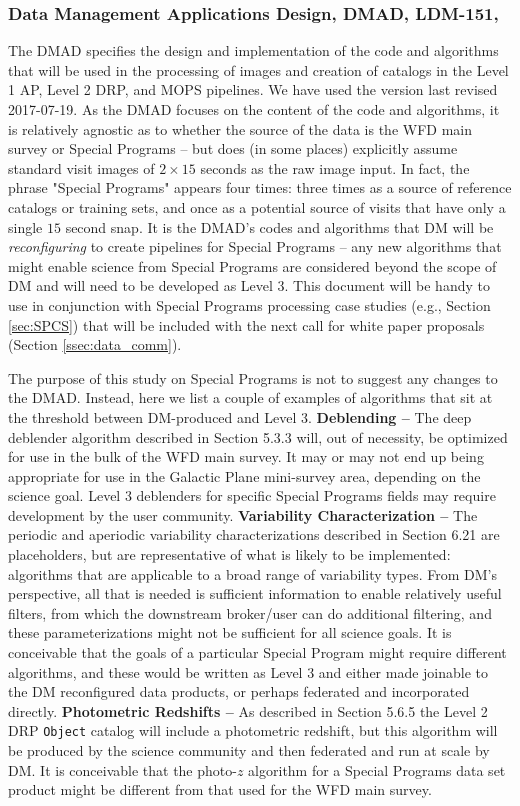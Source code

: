 \documentclass[DM,lsstdraft,toc]{lsstdoc}
\begin{document}
\subsubsection{Data Management Applications Design, DMAD, LDM-151, \cite{LDM-151}}\label{sssec:dmplans_review_dmad}

The DMAD specifies the design and implementation of the code and algorithms that will be used in the processing of images and creation of catalogs in the Level 1 AP, Level 2 DRP, and MOPS pipelines. We have used the version last revised 2017-07-19. As the DMAD focuses on the content of the code and algorithms, it is relatively agnostic as to whether the source of the data is the WFD main survey or Special Programs -- but does (in some places) explicitly assume standard visit images of $2\times15$ seconds as the raw image input. In fact, the phrase "Special Programs" appears four times: three times as a source of reference catalogs or training sets, and once as a potential source of visits that have only a single $15$ second snap. It is the DMAD's codes and algorithms that DM will be {\it reconfiguring} to create pipelines for Special Programs -- any new algorithms that might enable science from Special Programs are considered beyond the scope of DM and will need to be developed as Level 3. This document will be handy to use in conjunction with Special Programs processing case studies (e.g., Section \ref{sec:SPCS}) that will be included with the next call for white paper proposals (Section \ref{ssec:data_comm}). 

The purpose of this study on Special Programs is not to suggest any changes to the DMAD. Instead, here we list a couple of examples of algorithms that sit at the threshold between DM-produced and Level 3. {\bf Deblending --} The deep deblender algorithm described in Section 5.3.3 will, out of necessity, be optimized for use in the bulk of the WFD main survey. It may or may not end up being appropriate for use in the Galactic Plane mini-survey area, depending on the science goal. Level 3 deblenders for specific Special Programs fields may require development by the user community. {\bf Variability Characterization --} The periodic and aperiodic variability characterizations described in Section 6.21 are placeholders, but are representative of what is likely to be implemented: algorithms that are applicable to a broad range of variability types. From DM's perspective, all that is needed is sufficient information to enable relatively useful filters, from which the downstream broker/user can do additional filtering, and these parameterizations might not be sufficient for all science goals. It is conceivable that the goals of a particular Special Program might require different algorithms, and these would be written as Level 3 and either made joinable to the DM reconfigured data products, or perhaps federated and incorporated directly. {\bf Photometric Redshifts --} As described in Section 5.6.5 the Level 2 DRP {\tt Object} catalog will include a photometric redshift, but this algorithm will be produced by the science community and then federated and run at scale by DM. It is conceivable that the photo-$z$ algorithm for a Special Programs data set product might be different from that used for the WFD main survey. 
\end{document}
